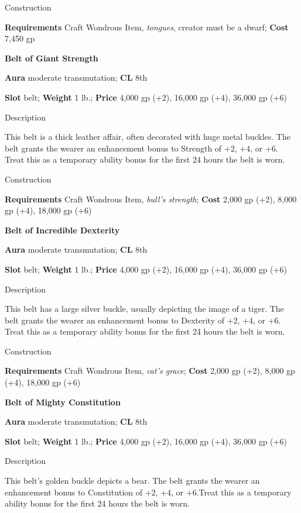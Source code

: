 Construction
				
\textbf{Requirements} Craft Wondrous Item, \textit{tongues}, creator must be a dwarf; \textbf{Cost }7,450 gp
				
\textbf{Belt of Giant Strength}
				
\textbf{Aura} moderate transmutation; \textbf{CL} 8th
				
\textbf{Slot }belt; \textbf{Weight} 1 lb.; \textbf{Price} 4,000 gp (+2), 16,000 gp (+4), 36,000 gp (+6)
				
Description
				
This belt is a thick leather affair, often decorated with huge metal buckles. The belt grants the wearer an enhancement bonus to Strength of +2, +4, or +6. Treat this as a temporary ability bonus for the first 24 hours the belt is worn.
				
Construction
				
\textbf{Requirements }Craft Wondrous Item, \textit{bull's strength}; \textbf{Cost} 2,000 gp (+2), 8,000 gp (+4), 18,000 gp (+6)
				
\textbf{Belt of Incredible Dexterity}
				
\textbf{Aura} moderate transmutation; \textbf{CL} 8th
				
\textbf{Slot }belt; \textbf{Weight} 1 lb.; \textbf{Price} 4,000 gp (+2), 16,000 gp (+4), 36,000 gp (+6)
				
Description
				
This belt has a large silver buckle, usually depicting the image of a tiger. The belt grants the wearer an enhancement bonus to Dexterity of +2, +4, or +6. Treat this as a temporary ability bonus for the first 24 hours the belt is worn.
				
Construction
				
\textbf{Requirements }Craft Wondrous Item, \textit{cat's grace}; \textbf{Cost} 2,000 gp (+2), 8,000 gp (+4), 18,000 gp (+6)
				
\textbf{Belt of Mighty Constitution}
				
\textbf{Aura} moderate transmutation; \textbf{CL} 8th
				
\textbf{Slot }belt; \textbf{Weight} 1 lb.; \textbf{Price} 4,000 gp (+2), 16,000 gp (+4), 36,000 gp (+6)
				
Description
				
This belt's golden buckle depicts a bear. The belt grants the wearer an enhancement bonus to Constitution of +2, +4, or +6.Treat this as a temporary ability bonus for the first 24 hours the belt is worn.
				
